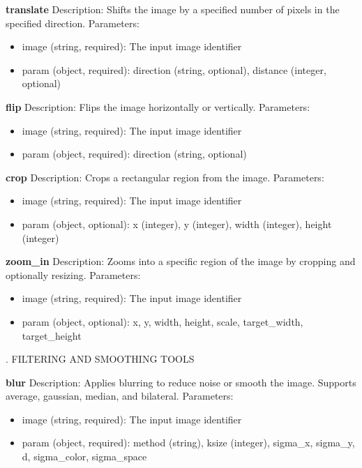 \documentclass[runningheads]{llncs}
\begin{document}
\begin{tcolorbox}
\noindent \textbf{translate}
\newline Description: Shifts the image by a specified number of pixels in the specified direction.
\newline Parameters:
\begin{itemize}
    \item image (string, required): The input image identifier
    \item param (object, required): direction (string, optional), distance (integer, optional)
\end{itemize}

\noindent \textbf{flip}
\newline Description: Flips the image horizontally or vertically.
\newline Parameters:
\begin{itemize}
    \item image (string, required): The input image identifier
    \item param (object, required): direction (string, optional)
\end{itemize}

\noindent \textbf{crop}
\newline Description: Crops a rectangular region from the image.
\newline Parameters:
\begin{itemize}
    \item image (string, required): The input image identifier
    \item param (object, optional): x (integer), y (integer), width (integer), height (integer)
\end{itemize}

\noindent \textbf{zoom\_in}
\newline Description: Zooms into a specific region of the image by cropping and optionally resizing.
\newline Parameters:
\begin{itemize}
    \item image (string, required): The input image identifier
    \item param (object, optional): x, y, width, height, scale, target\_width, target\_height
\end{itemize}

\vspace{4mm}
. FILTERING AND SMOOTHING TOOLS
\vspace{2mm}

\noindent \textbf{blur}
\newline Description: Applies blurring to reduce noise or smooth the image. Supports average, gaussian, median, and bilateral.
\newline Parameters:
\begin{itemize}
    \item image (string, required): The input image identifier
    \item param (object, required): method (string), ksize (integer), sigma\_x, sigma\_y, d, sigma\_color, sigma\_space
\end{itemize}


\end{tcolorbox}
\end{document}
